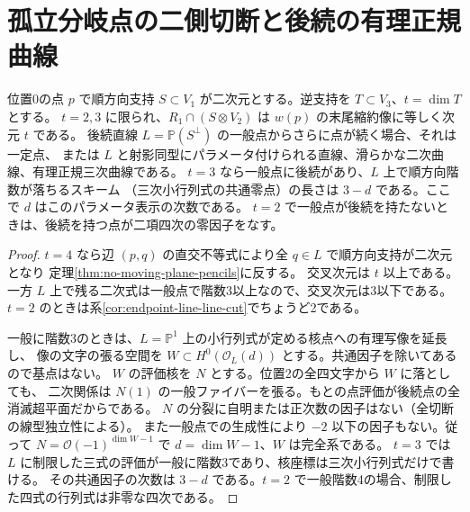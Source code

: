 \section{孤立分岐点の二側切断と後続の有理正規曲線}
\label{sec:isolated-branch-blocks}
\begin{proposition}\label{prop:isolated-branch-blocks}
位置0の点 $p$ で順方向支持 $S\subset V_1$ が二次元とする。逆支持を $T\subset V_3$、$t=\dim T$ とする。
$t=2,3$ に限られ、$R_1\cap(S\otimes V_2)$ は $w(p)$ の末尾縮約像に等しく次元 $t$ である。
後続直線 $L=\mathbb P(S^\perp)$ の一般点からさらに点が続く場合、それは一定点、
または $L$ と射影同型にパラメータ付けられる直線、滑らかな二次曲線、有理正規三次曲線である。
$t=3$ なら一般点に後続があり、$L$ 上で順方向階数が落ちるスキーム
（三次小行列式の共通零点）の長さは $3-d$ である。ここで $d$ はこのパラメータ表示の次数である。
$t=2$ で一般点が後続を持たないときは、後続を持つ点が二項四次の零因子をなす。
\end{proposition}
\begin{proof}
$t=4$ なら辺 $(p,q)$ の直交不等式により全 $q\in L$ で順方向支持が二次元となり
定理\ref{thm:no-moving-plane-pencils}に反する。
交叉次元は $t$ 以上である。一方 $L$ 上で残る二次式は一般点で階数3以上なので、交叉次元は3以下である。
$t=2$ のときは系\ref{cor:endpoint-line-line-cut}でちょうど2である。

一般に階数3のときは、$L=\mathbb P^1$ 上の小行列式が定める核点への有理写像を延長し、
像の文字の張る空間を $W\subset H^0(\mathcal O_L(d))$ とする。共通因子を除いてあるので基点はない。
$W$ の評価核を $N$ とする。位置2の全四文字から $W$ に落としても、
二次関係は $N(1)$ の一般ファイバーを張る。もとの点評価が後続点の全消滅超平面だからである。
$N$ の分裂に自明または正次数の因子はない（全切断の線型独立性による）。
また一般点での生成性により $-2$ 以下の因子もない。従って
$N=\mathcal O(-1)^{\dim W-1}$ で $d=\dim W-1$、$W$ は完全系である。
$t=3$ では $L$ に制限した三式の評価が一般に階数3であり、核座標は三次小行列式だけで書ける。
その共通因子の次数は $3-d$ である。$t=2$ で一般階数4の場合、制限した四式の行列式は非零な四次である。
\end{proof}

